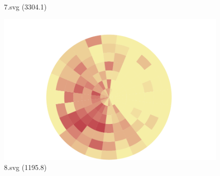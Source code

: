 \documentclass[journal]{IEEEtran}
\begin{document}
\begin{figure}[!htbp]
\begin{minipage}{0.233\columnwidth}
{7.svg (3304.1)}
\end{minipage}
\hfill
\begin{minipage}{0.233\columnwidth}
\centering
\includegraphics[width=\textwidth]{Test_set/8.pdf}
{8.svg (1195.8)}
\end{minipage}
\end{figure}
\end{document}
